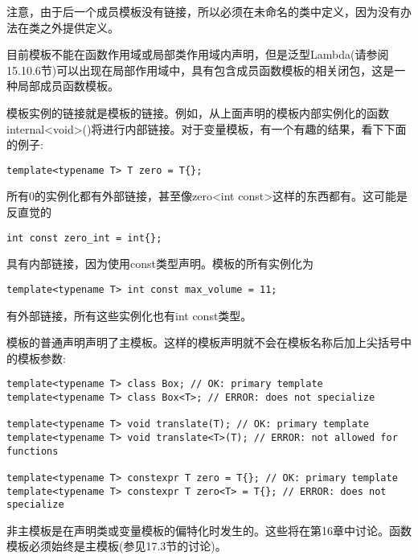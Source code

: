 注意，由于后一个成员模板没有链接，所以必须在未命名的类中定义，因为没有办法在类之外提供定义。

目前模板不能在函数作用域或局部类作用域内声明，但是泛型Lambda(请参阅15.10.6节)可以出现在局部作用域中，具有包含成员函数模板的相关闭包，这是一种局部成员函数模板。

模板实例的链接就是模板的链接。例如，从上面声明的模板内部实例化的函数internal<void>()将进行内部链接。对于变量模板，有一个有趣的结果，看下下面的例子:

\begin{lstlisting}[style=styleCXX]
template<typename T> T zero = T{};
\end{lstlisting}

所有0的实例化都有外部链接，甚至像zero<int const>这样的东西都有。这可能是反直觉的

\begin{lstlisting}[style=styleCXX]
int const zero_int = int{};
\end{lstlisting}

具有内部链接，因为使用const类型声明。模板的所有实例化为

\begin{lstlisting}[style=styleCXX]
template<typename T> int const max_volume = 11;
\end{lstlisting}

有外部链接，所有这些实例化也有int const类型。


模板的普通声明声明了主模板。这样的模板声明就不会在模板名称后加上尖括号中的模板参数:

\begin{lstlisting}[style=styleCXX]
template<typename T> class Box; // OK: primary template
template<typename T> class Box<T>; // ERROR: does not specialize

template<typename T> void translate(T); // OK: primary template
template<typename T> void translate<T>(T); // ERROR: not allowed for functions

template<typename T> constexpr T zero = T{}; // OK: primary template
template<typename T> constexpr T zero<T> = T{}; // ERROR: does not specialize
\end{lstlisting}

非主模板是在声明类或变量模板的偏特化时发生的。这些将在第16章中讨论。函数模板必须始终是主模板(参见17.3节的讨论)。


















